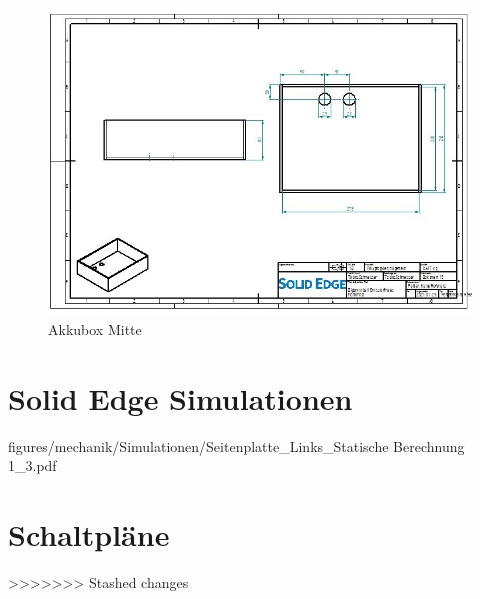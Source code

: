 \begin{figure} [H]
	\begin{center}
		\includegraphics[angle=90]{figures/mechanik/Box_3_Zeichnung.jpg}
			\caption{Akkubox Mitte}
			\label{fig:Akkubox Mitte}
	\end{center}
\end{figure}


\chapter{Solid Edge Simulationen}


{figures/mechanik/Simulationen/Seitenplatte_Links_Statische Berechnung 1_3.pdf}






\chapter{Schaltpläne}
>>>>>>> Stashed changes
